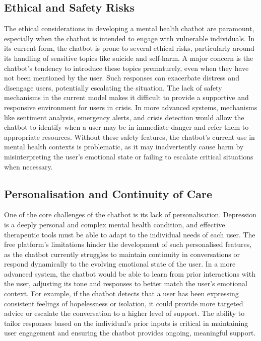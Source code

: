\subsection{Ethical and Safety Risks} 
The ethical considerations in developing a mental health chatbot are paramount, especially when the chatbot is intended to engage with vulnerable individuals. In its current form, the chatbot is prone to several ethical risks, particularly around its handling of sensitive topics like suicide and self-harm. A major concern is the chatbot’s tendency to introduce these topics prematurely, even when they have not been mentioned by the user. Such responses can exacerbate distress and disengage users, potentially escalating the situation.
The lack of safety mechanisms in the current model makes it difficult to provide a supportive and responsive environment for users in crisis. In more advanced systems, mechanisms like sentiment analysis, emergency alerts, and crisis detection would allow the chatbot to identify when a user may be in immediate danger and refer them to appropriate resources. Without these safety features, the chatbot’s current use in mental health contexts is problematic, as it may inadvertently cause harm by misinterpreting the user’s emotional state or failing to escalate critical situations when necessary.
\subsection{Personalisation and Continuity of Care} 
One of the core challenges of the chatbot is its lack of personalisation. Depression is a deeply personal and complex mental health condition, and effective therapeutic tools must be able to adapt to the individual needs of each user. The free platform’s limitations hinder the development of such personalised features, as the chatbot currently struggles to maintain continuity in conversations or respond dynamically to the evolving emotional state of the user.
In a more advanced system, the chatbot would be able to learn from prior interactions with the user, adjusting its tone and responses to better match the user’s emotional context. For example, if the chatbot detects that a user has been expressing consistent feelings of hopelessness or isolation, it could provide more targeted advice or escalate the conversation to a higher level of support. The ability to tailor responses based on the individual’s prior inputs is critical in maintaining user engagement and ensuring the chatbot provides ongoing, meaningful support.

